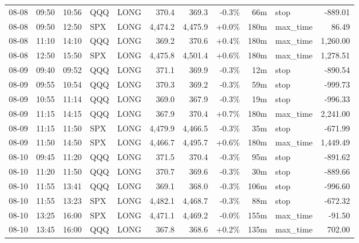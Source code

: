 \documentclass[11pt,a4paper,twoside]{article}
\begin{document}
\begin{center}
\begin{longtable}{>{\color{txtmain}}l l l l l r r r r >{\color{txtmain}}l r}
08-08 & 09:50 & 10:56 & QQQ & LONG & 370.4 & 369.3 & \textcolor{lossred}{-0.3\%} & 66m & stop & \textcolor{lossred}{-889.01} \\
08-08 & 09:50 & 12:50 & SPX & LONG & 4,474.2 & 4,475.9 & \textcolor{wingreen}{+0.0\%} & 180m & max\_time & \textcolor{wingreen}{86.49} \\
08-08 & 11:10 & 14:10 & QQQ & LONG & 369.2 & 370.6 & \textcolor{wingreen}{+0.4\%} & 180m & max\_time & \textcolor{wingreen}{1,260.00} \\
08-08 & 12:50 & 15:50 & SPX & LONG & 4,475.8 & 4,501.4 & \textcolor{wingreen}{+0.6\%} & 180m & max\_time & \textcolor{wingreen}{1,278.51} \\
08-09 & 09:40 & 09:52 & QQQ & LONG & 371.1 & 369.9 & \textcolor{lossred}{-0.3\%} & 12m & stop & \textcolor{lossred}{-890.54} \\
08-09 & 09:55 & 10:54 & QQQ & LONG & 370.3 & 369.2 & \textcolor{lossred}{-0.3\%} & 59m & stop & \textcolor{lossred}{-999.73} \\
08-09 & 10:55 & 11:14 & QQQ & LONG & 369.0 & 367.9 & \textcolor{lossred}{-0.3\%} & 19m & stop & \textcolor{lossred}{-996.33} \\
08-09 & 11:15 & 14:15 & QQQ & LONG & 367.9 & 370.4 & \textcolor{wingreen}{+0.7\%} & 180m & max\_time & \textcolor{wingreen}{2,241.00} \\
08-09 & 11:15 & 11:50 & SPX & LONG & 4,479.9 & 4,466.5 & \textcolor{lossred}{-0.3\%} & 35m & stop & \textcolor{lossred}{-671.99} \\
08-09 & 11:50 & 14:50 & SPX & LONG & 4,466.7 & 4,495.7 & \textcolor{wingreen}{+0.6\%} & 180m & max\_time & \textcolor{wingreen}{1,449.49} \\
08-10 & 09:45 & 11:20 & QQQ & LONG & 371.5 & 370.4 & \textcolor{lossred}{-0.3\%} & 95m & stop & \textcolor{lossred}{-891.62} \\
08-10 & 11:20 & 11:50 & QQQ & LONG & 370.7 & 369.6 & \textcolor{lossred}{-0.3\%} & 30m & stop & \textcolor{lossred}{-889.66} \\
08-10 & 11:55 & 13:41 & QQQ & LONG & 369.1 & 368.0 & \textcolor{lossred}{-0.3\%} & 106m & stop & \textcolor{lossred}{-996.60} \\
08-10 & 11:55 & 13:23 & SPX & LONG & 4,482.1 & 4,468.7 & \textcolor{lossred}{-0.3\%} & 88m & stop & \textcolor{lossred}{-672.32} \\
08-10 & 13:25 & 16:00 & SPX & LONG & 4,471.1 & 4,469.2 & \textcolor{lossred}{-0.0\%} & 155m & max\_time & \textcolor{lossred}{-91.50} \\
08-10 & 13:45 & 16:00 & QQQ & LONG & 367.8 & 368.6 & \textcolor{wingreen}{+0.2\%} & 135m & max\_time & \textcolor{wingreen}{702.00} \\

\end{longtable}
\end{center}
\end{document}
